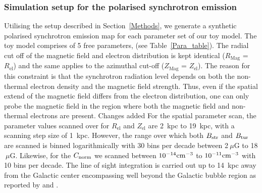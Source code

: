 \documentclass[usenatbib]{mnras}
\newcommand{\Vasu}[1]{{\color{purple}#1}}
\begin{document}
\subsubsection{Simulation setup for the polarised synchrotron emission}
Utilising the setup described in Section~\ref{Methods}, we generate a synthetic polarised synchrotron emission map for each parameter set of our toy model. The toy model comprises of 5 free parameters, (see Table~\ref{Para_table}). The radial cut off of the magnetic field and electron distribution is kept identical ($R_{\mathrm{Mag}}$ = $R_{\mathrm{el}}$) and the same applies to the azimuthal cut-off ($Z_{\mathrm{Mag}}$ = $Z_{\mathrm{el}}$). The reason for this constraint is that the synchrotron radiation level depends on both the non-thermal electron density and the magnetic field strength. Thus, even if the spatial extend of the magnetic field differs from the electron distribution, one can only probe the magnetic field in the region where both the magnetic field and non-thermal electrons are present. 
\Vasu{Changes added} 
For the spatial parameter scan, the parameter values scanned over for $R_{\mathrm{el}}$ and $Z_{\mathrm{el}}$ are 2~kpc to 19~kpc, with a scanning step size of 1~kpc. 
However, the range over which both $B_{\rm str}$ and $B_{\rm tur}$ are scanned is binned logarithmically with 30 bins per decade between 2$~\mu$G to 18$~\mu$G. Likewise, for the $C_{\rm norm}$ we scanned between $10^{-14} \rm cm^{-3}$ to $10^{-11} \rm cm^{-3}$ with 10 bins per decade. The line of sight integration is carried out up to 14~kpc away from the Galactic center encompassing well beyond the Galactic bubble region as reported by \citep{FERMI_2010} and \citep{eROSITA}.

\end{document}
